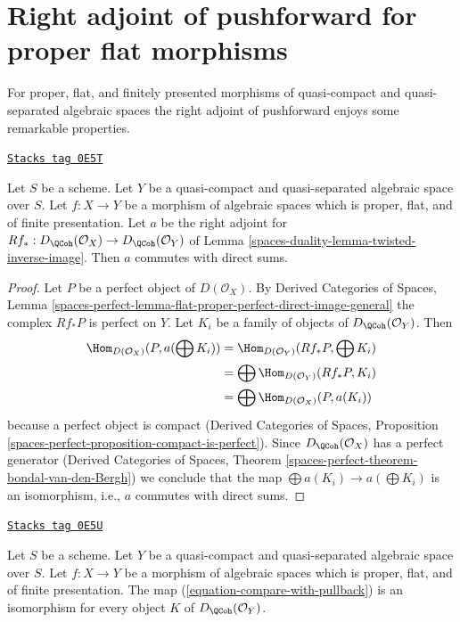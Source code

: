 \section{Right adjoint of pushforward for proper flat morphisms}
\label{spaces-duality-section-proper-flat}
For proper, flat, and finitely presented morphisms of quasi-compact
and quasi-separated algebraic spaces the right adjoint of pushforward
enjoys some remarkable properties.

\begin{lemma}
\label{spaces-duality-lemma-proper-flat}
\href{https://stacks.math.columbia.edu/tag/0E5T}{\texttt{Stacks tag 0E5T}}

Let $S$ be a scheme.
Let $Y$ be a quasi-compact and quasi-separated algebraic space over $S$.
Let $f : X \to Y$ be a morphism of algebraic spaces which is proper, flat, and
of finite presentation.
Let $a$ be the right adjoint for
$Rf_* : D_\QCoh(\mathcal{O}_X) \to D_\QCoh(\mathcal{O}_Y)$ of
Lemma \ref{spaces-duality-lemma-twisted-inverse-image}. Then $a$ commutes with direct sums.
\end{lemma}

\begin{proof}
Let $P$ be a perfect object of $D(\mathcal{O}_X)$. By
Derived Categories of Spaces, Lemma
\ref{spaces-perfect-lemma-flat-proper-perfect-direct-image-general}
the complex $Rf_*P$ is perfect on $Y$.
Let $K_i$ be a family of objects of $D_\QCoh(\mathcal{O}_Y)$.
Then
\begin{align*}
\Hom_{D(\mathcal{O}_X)}(P, a(\bigoplus K_i))
& =
\Hom_{D(\mathcal{O}_Y)}(Rf_*P, \bigoplus K_i) \\
& =
\bigoplus \Hom_{D(\mathcal{O}_Y)}(Rf_*P, K_i) \\
& =
\bigoplus \Hom_{D(\mathcal{O}_X)}(P, a(K_i))
\end{align*}
because a perfect object is compact (Derived Categories of Spaces,
Proposition \ref{spaces-perfect-proposition-compact-is-perfect}).
Since $D_\QCoh(\mathcal{O}_X)$ has a perfect generator
(Derived Categories of Spaces, Theorem
\ref{spaces-perfect-theorem-bondal-van-den-Bergh})
we conclude that the map $\bigoplus a(K_i) \to a(\bigoplus K_i)$
is an isomorphism, i.e., $a$ commutes with direct sums.
\end{proof}

\begin{lemma}
\label{spaces-duality-lemma-compare-with-pullback-flat-proper}
\href{https://stacks.math.columbia.edu/tag/0E5U}{\texttt{Stacks tag 0E5U}}

Let $S$ be a scheme.
Let $Y$ be a quasi-compact and quasi-separated algebraic space over $S$.
Let $f : X \to Y$ be a morphism of algebraic spaces which is proper, flat, and
of finite presentation.
The map (\ref{equation-compare-with-pullback}) is an isomorphism
for every object $K$ of $D_\QCoh(\mathcal{O}_Y)$.
\end{lemma}

